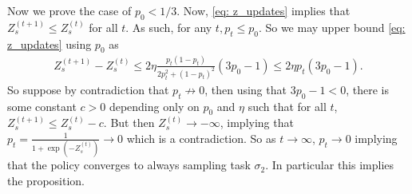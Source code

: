 \documentclass{article}
\theoremstyle{plain}
\theoremstyle{definition}
\theoremstyle{remark}
\begin{document}
Now we prove the case of $p_0 < 1/3$. Now, \eqref{eq: z_updates} implies that $Z_{s}^{(t+1)} \leq Z_{s}^{(t)}$ for all $t$. As such, for any $t, p_t \leq p_0$. So we may upper bound \eqref{eq: z_updates} using $p_0$ as
\begin{align*}
    Z_{s}^{(t+1)} - Z_{s}^{(t)} \leq 2\eta \frac{p_t\left(1-p_t\right)}{2p_t^2 + (1-p_t)^2}(3p_0 - 1) \leq 2 \eta p_t (3p_0 - 1).
\end{align*}
So suppose by contradiction that $p_t \not \to 0$, then using that $3p_0 - 1<0$, there is some constant $c>0$ depending only on $p_0$ and $\eta$ such that for all $t$, $Z^{(t+1)}_s \leq Z^{(t)}_s - c$. 
But then $Z^{(t)}_s \to -\infty$, implying that $p_t = \frac{1}{1+\exp(-Z^{(t)}_s)} \to 0$ which is a contradiction. So as $t\to\infty$, $p_t\to 0$ implying that the policy converges to always sampling task $\sigma_2$. In particular this implies the proposition.


\end{document}
